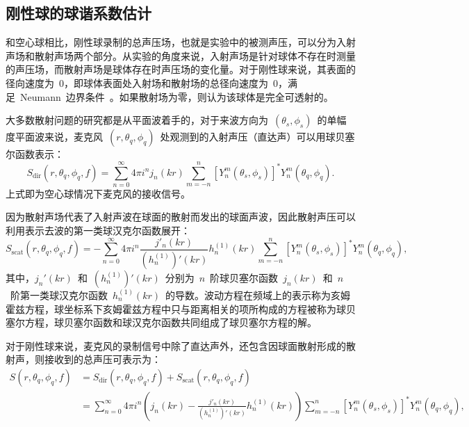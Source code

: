 \subsection{刚性球的球谐系数估计}

和空心球相比，刚性球录制的总声压场，也就是实验中的被测声压，可以分为入射声场和散射声场两个部分。从实验的角度来说，入射声场是针对球体不存在时测量的声压场，而散射声场是球体存在时声压场的变化量。对于刚性球来说，其表面的径向速度为~0，即球体表面处入射场和散射场的总径向速度为~0，满足~Neumann~边界条件~。如果散射场为零，则认为该球体是完全可透射的。

大多数散射问题的研究都是从平面波着手的，对于来波方向为~$(\theta_s,\phi_s)$~的单幅度平面波来说，麦克风~$(r,\theta _q,\phi _q)$~处观测到的入射声压（直达声）可以用球贝塞尔函数表示：
\begin{equation}  \label{SMic_pressure open}
   S_{\mathrm{dir}}(r,\theta _q,\phi _q,f)=\sum _{n=0}^{\infty}4\pi i^n j_n(kr)\sum _{m=-n}^{n}[Y_n ^{m}(\theta_s,\phi_s)]^*Y_n ^{m}(\theta_q,\phi_q).
\end{equation}
上式即为空心球情况下麦克风的接收信号。

因为散射声场代表了入射声波在球面的散射而发出的球面声波，因此散射声压可以利用表示去波的第一类球汉克尔函数展开：
\begin{equation}  \label{SMic_pressure scat}
   S_{\mathrm{scat}}(r,\theta _q,\phi _q,f)=-\sum _{n=0}^{\infty}4\pi i^n \frac{j'_n (kr)}{({h^{(1)}_n})'(kr)}h_n^{(1)}(kr)\sum _{m=-n}^{n}[Y_n ^{m}(\theta_s,\phi_s)]^*Y_n ^{m}(\theta _q,\phi _q),
\end{equation}
其中，$j_n'(kr)$~和~$({h^{(1)}_n})'(kr)$~分别为~$n$~阶球贝塞尔函数~$j_n(kr)$~和~$n$~阶第一类球汉克尔函数~$h_n^{(1)}(kr)$~的导数。波动方程在频域上的表示称为亥姆霍兹方程，球坐标系下亥姆霍兹方程中只与距离相关的项所构成的方程被称为球贝塞尔方程，球贝塞尔函数和球汉克尔函数共同组成了球贝塞尔方程的解。

对于刚性球来说，麦克风的录制信号中除了直达声外，还包含因球面散射形成的散射声，则接收到的总声压可表示为：
\begin{align}  \label{SMic_pressure rigid}
   S(r,\theta_q,\phi_q,f)&= S_{\mathrm{dir}}(r,\theta_q,\phi_q,f)+S_{\mathrm{scat}}(r,\theta_q,\phi_q,f)   \nonumber \\
   &=\sum _{n=0}^{\infty} 4\pi i^n \left( j_n(kr)-\frac{j'_n (kr)}{({h^{(1)}_n})'(kr)}h_n^{(1)}(kr) \right) \sum _{m=-n}^{n}[Y_n ^{m}(\theta_s,\phi_s)]^*Y_n ^{m}(\theta_q,\phi_q),
\end{align}

